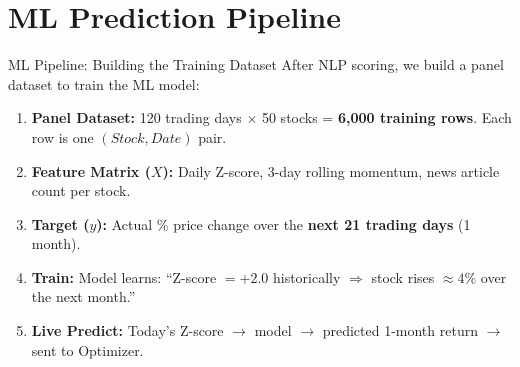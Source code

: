 \documentclass[aspectratio=169, 10pt]{beamer}
\begin{document}
\section{ML Prediction Pipeline}
\begin{frame}{ML Pipeline: Building the Training Dataset}
    \small
    After NLP scoring, we build a panel dataset to train the ML model:
    \vspace{0.3em}
    \begin{enumerate}
        \item \textbf{Panel Dataset:} 120 trading days $\times$ 50 stocks = \textbf{6,000 training rows}. Each row is one $(Stock, Date)$ pair.
        \item \textbf{Feature Matrix ($X$):} Daily Z-score, 3-day rolling momentum, news article count per stock.
        \item \textbf{Target ($y$):} Actual \% price change over the \textbf{next 21 trading days} (1 month).
        \item \textbf{Train:} Model learns: ``Z-score $= +2.0$ historically $\Rightarrow$ stock rises $\approx 4\%$ over the next month.''
        \item \textbf{Live Predict:} Today's Z-score $\rightarrow$ model $\rightarrow$ predicted 1-month return $\rightarrow$ sent to Optimizer.
    \end{enumerate}
\end{frame}
\end{document}
